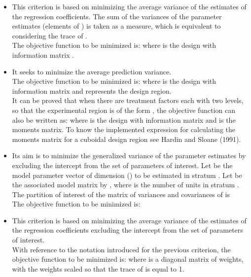 \documentclass[a4paper]{book}
\begin{document}
\begin{Details}
\begin{itemize}
\item{}   This criterion is based on
minimizing the average variance of the estimates of the regression coefficients.
The sum of the variances of the parameter estimates (elements of
\eqn{\hat{\beta}}{}) is taken as a measure, which is equivalent to
considering the trace of . \\{}
The objective function to be minimized is:
where  is the design with information matrix .

\item{}   It seeks to minimize the average
prediction variance. \\{}
The objective function to be minimized is:
where  is the design with information matrix  and \eqn{\chi}{}
represents the design region. \\{}
It can be proved that when there are  treatment factors each with two
levels, so that the experimental region is of the form ,
the objective function can also be written as:
where  is the design with information matrix  and
 is the moments matrix.
To know the implemented expression for calculating the moments matrix for a
cuboidal design region see Hardin and Sloane (1991).

\item{}   Its aim is to minimize the generalized
variance of the parameter estimates by excluding the intercept from the set
of parameters of interest. Let  be the model parameter
vector of dimension () to be estimated in stratum .
Let  be the associated model matrix  by , where  is the number of units in stratum .
The partition of interest of the matrix of variances and covariances of
 is
 \\{}
The objective function to be minimized is:

\item{}  This criterion is based on minimizing
the average variance of the estimates of the regression coefficients excluding
the intercept from the set of parameters of interest. \\{}
With reference to the notation introduced for the previous criterion, the
objective function to be minimized is:
where  is a diagonal matrix of weights, with the weights scaled so that
the trace of  is equal to 1.


\end{itemize}
\end{Details}
\end{document}
